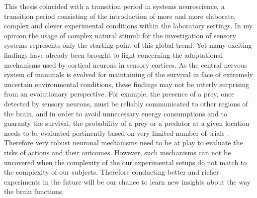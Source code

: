 This thesis coincided with a transition period in systems neuroscience, a
transition period consisting of the introduction of more and more
elaborate, complex and clever experimental conditions within the laboratory
settings. In my opinion the usage of complex natural stimuli for the
investigation of sensory systems represents only the starting point of this
global trend. Yet many exciting findings have already been brought to light
concerning the adaptational mechanisms used by cortical neurons in sensory
cortices. As the central nervous system of mammals is evolved for
maintaining of the survival in face of extremely uncertain environmental
conditions, these findings may not be utterly surprising from an
evolutionary perspective. For example, the presence of a prey, once
detected by sensory neurons, must be reliably communicated to other regions
of the brain, and in order to avoid unnecessary energy consumptions and to
guaranty the survival, the probability of a prey or a predator at a given
location needs to be evaluated pertinently based on very limited number of
trials \citep{glimcher2003a}. Therefore very robust neuronal mechanisms
need to be at play to evaluate the risks of actions and their outcomes.
However, such mechanisms can not be uncovered when the complexity of the
our experimental setups do not match to the complexity of our subjects.
Therefore  conducting better and richer experiments in the future will be
our chance to learn new insights about the way the brain functions.
